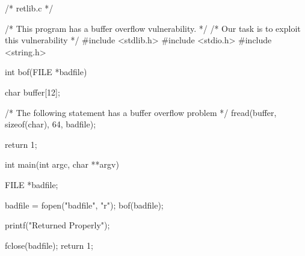 /* retlib.c */

/* This program has a buffer overflow vulnerability. */
/* Our task is to exploit this vulnerability */
#include <stdlib.h>
#include <stdio.h>
#include <string.h>

int bof(FILE *badfile)
{
    char buffer[12];

    /* The following statement has a buffer overflow problem */
    fread(buffer, sizeof(char), 64, badfile);

    return 1;
}

int main(int argc, char **argv)
{
    FILE *badfile;

    badfile = fopen("badfile", "r");
    bof(badfile);

    printf("Returned Properly\n");

    fclose(badfile);
    return 1;
}
